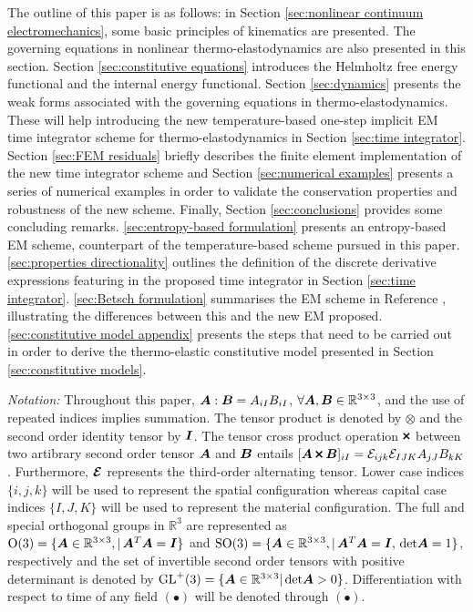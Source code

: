 The outline of this paper is as follows: in Section \ref{sec:nonlinear continuum electromechanics}, some basic principles of kinematics are presented. 
The governing equations in nonlinear thermo-elastodynamics are also presented in this section. Section \ref{sec:constitutive equations} introduces the Helmholtz free energy functional and the internal energy functional. 
Section \ref{sec:dynamics} presents the weak forms associated with the governing equations in thermo-elastodynamics. These will help introducing the new temperature-based one-step implicit EM time integrator scheme for thermo-elastodynamics in Section \ref{sec:time integrator}. 
Section \ref{sec:FEM residuals} briefly describes the finite element implementation of the new time integrator scheme and Section \ref{sec:numerical examples} presents a series of numerical examples in order to validate the conservation properties and robustness of the new scheme. 
Finally, Section \ref{sec:conclusions} provides some concluding remarks. 
\ref{sec:entropy-based formulation} presents an entropy-based EM scheme, counterpart of the temperature-based scheme pursued in this paper. \ref{sec:properties directionality} outlines the definition of the discrete derivative expressions featuring in the proposed time integrator in Section \ref{sec:time integrator}. \ref{sec:Betsch formulation} summarises the EM scheme in Reference \cite{Betsch2018Thermo}, illustrating the differences between this and the new EM proposed. \ref{sec:constitutive model appendix} presents  the steps that need to be carried out in order to derive the thermo-elastic constitutive model presented in Section \ref{sec:constitutive models}.

\noindent \textit{Notation:} Throughout this paper, $\boldsymbol{A}:\boldsymbol{B}=A_{iI}B_{iI}$, $\forall \boldsymbol{A},\boldsymbol{B}\in\mathbb{R}^{3\times 3}$,  and the use of repeated indices implies summation. The tensor product is denoted by $\otimes$ and the second order identity tensor by $\boldsymbol{I}$. The tensor cross product operation $\Cross$ between two artibrary second order tensor $\boldsymbol{A}$ and $\boldsymbol{B}$ entails $[\vect{A}\Cross\vect{B}]_{iI}=\mathcal{E}_{ijk}\mathcal{E}_{IJK}A_{jJ}B_{kK}$.
Furthermore, $\boldsymbol{\mathcal{E}}$ represents the third-order alternating tensor. Lower case indices $\{i,j,k\}$ will be used to represent the spatial configuration whereas capital case indices $\{I,J,K\}$ will be used to represent the material configuration.
The full and special orthogonal groups in $\mathbb{R}^3$ are represented as $\text{O}(3)=\{\boldsymbol{A}\in\mathbb{R}^{3\times 3},\vert\,\boldsymbol{A}^T\boldsymbol{A}=\boldsymbol{I}\}$ and $\text{SO}(3)=\{\boldsymbol{A}\in\mathbb{R}^{3\times 3},\vert\,\boldsymbol{A}^T\boldsymbol{A}=\boldsymbol{I},\,\text{det}\boldsymbol{A}=1\}$, respectively and the set of invertible second order tensors with positive determinant is denoted by $\text{GL}^+(3)=\{\boldsymbol{A}\in\mathbb{R}^{3\times 3} \vert  \,\text{det}{\boldsymbol{A}}>0\}$. Differentiation with respect to time of any field ${(\bullet)}$ will be denoted through $\dot{(\bullet)}$.
%

